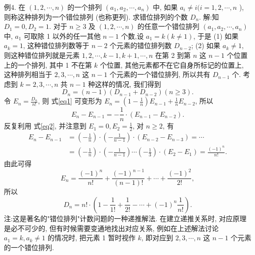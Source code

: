 例4. 在 $(1,2, \cdots, n)$ 的一个排列 $\left(a_1, a_2, \cdots, a_n\right)$ 中, 如果 $a_i \neq i(i= 1,2, \cdots, n$ ), 则称这种排列为一个错位排列 (也称更列). 求错位排列的个数 $D_n$.
解:知 $D_1=0, D_2=1$.
对于 $n \geqslant 3$ 及 $(1,2, \cdots, n)$ 的任意一个错位排列 $\left(a_1, a_2, \cdots, a_n\right)$ 中, $a_1$ 可取除 1 以外的任一其他 $n-1$ 个数,设 $a_1=k(k \neq 1)$, 于是
(1) 如果 $a_k=1$, 这种错位排列数等于 $n-2$ 个元素的错位排列数 $D_{n-2}$;
(2) 如果 $a_k \neq 1$, 则这种错位排列就是元素 $1,2, \cdots, k-1, k+1, \cdots, n$ 在第 2 到第 $n$ 这 $n-1$ 个位置上的一个排列, 其中 1 不在第 $k$ 个位置, 其他元素都不在它自身所标记的位置上, 这种排列相当于 $2,3, \cdots, n$ 这 $n-1$ 个元素的一个错位排列, 所以共有 $D_{n-1}$ 个.
考虑到 $k=2,3, \cdots, n$ 共 $n-1$ 种这样的情况, 我们得到
$$
D_n=(n-1)\left(D_{n-1}+D_{n-2}\right)(n \geqslant 3) . \label{eq1}
$$
令 $E_n=\frac{D_n}{n !}$, 则 式\ref{eq1} 可变形为 $E_n=\left(1-\frac{1}{n}\right) E_{n-1}+\frac{1}{n} E_{n-2}$, 所以
$$
E_n-E_{n-1}=-\frac{1}{n} \cdot\left(E_{n-1}-E_{n-2}\right) . \label{eq2}
$$
反复利用 式\ref{eq2}, 并注意到 $E_1=0, E_2=\frac{1}{2}$, 对 $n \geqslant 2$, 有
$$
\begin{aligned}
E_n-E_{n-1} & =\left(-\frac{1}{n}\right) \cdot\left(-\frac{1}{n-1}\right) \cdot\left(E_{n-2}-E_{n-3}\right)=\cdots \\
& =\left(-\frac{1}{n}\right) \cdot\left(-\frac{1}{n-1}\right) \cdots\left(-\frac{1}{3}\right) \cdot\left(E_2-E_1\right)=\frac{(-1)^n}{n !} .
\end{aligned}
$$
由此可得
$$
E_n=\frac{(-1)^n}{n !}+\frac{(-1)^{n-1}}{(n-1) !}+\cdots+\frac{(-1)^2}{2 !},
$$
所以
$$
D_n=n ! \cdot\left(1-\frac{1}{1 !}+\frac{1}{2 !}-\cdots+(-1)^n \frac{1}{n !}\right) .
$$
注:这是著名的"错位排列"计数问题的一种递推解法.
在建立递推关系时, 对应原理是必不可少的, 但有时候需要变通地找出对应关系, 例如在上述解法讨论 $a_1=k, a_k \neq 1$ 的情况时, 把元素 1 暂时视作 $k$, 即对应到 $2,3, \cdots, n$ 这 $n-1$ 个元素的一个错位排列.



